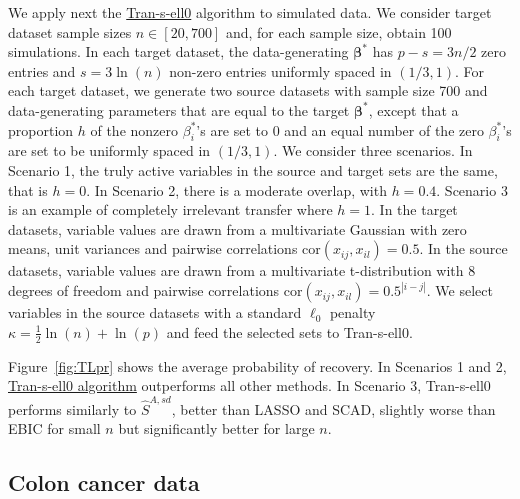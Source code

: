 \documentclass[
  12pt]{article}
\newcommand{\bbeta}{\boldsymbol{\beta}}
\begin{document}
We apply next the \hyperlink{lab:AlgoTL}{Tran-s-ell0} algorithm to simulated data. We consider target dataset sample sizes $n \in [20,700]$ and, for each sample size, obtain 100 simulations. %
In each target dataset, the data-generating $\bbeta^*$ has $p-s=3n/2$ zero entries and $s=3\ln(n)$ non-zero entries uniformly spaced in $(1/3,1)$. For each target dataset, we generate two source datasets with sample size 700 and data-generating parameters that are equal to the target $\bbeta^*$, except that a proportion $h$ of the nonzero $\beta_i^*$'s are set to 0 and an equal number of the zero $\beta_i^*$'s are set to be uniformly spaced in $(1/3,1)$. 
We consider three scenarios. In Scenario 1, the truly active variables in the source and target sets are the same, that is $h=0$. In Scenario 2, there is a moderate overlap, with $h=0.4$. Scenario 3 is an example of completely irrelevant transfer where $h=1$. In the target datasets, variable values are drawn from a multivariate Gaussian with zero means, unit variances and pairwise correlations $\mbox{cor}(x_{ij}, x_{il})= 0.5$. \color{green} In the source datasets, variable values are drawn from a multivariate t-distribution with 8 degrees of freedom and pairwise correlations $\mbox{cor}(x_{ij}, x_{il})= 0.5^{|i-j|}$.\color{black} 
We select variables in the source datasets with a standard $\ell_0$ penalty $\kappa=\tfrac12\ln(n)+\ln(p)$ and feed the selected sets to Tran-s-ell0. 

Figure~\ref{fig:TLpr} shows the average probability of recovery.
In Scenarios 1 and 2, \hyperlink{lab:AlgoTL}{Tran-s-ell0 algorithm} outperforms all other methods. In Scenario 3, Tran-s-ell0 performs similarly to $\hat S^{A,sd}$, better than LASSO and SCAD, slightly worse than EBIC for small $n$ but significantly better for large $n$.


\subsection{Colon cancer data}
\end{document}
